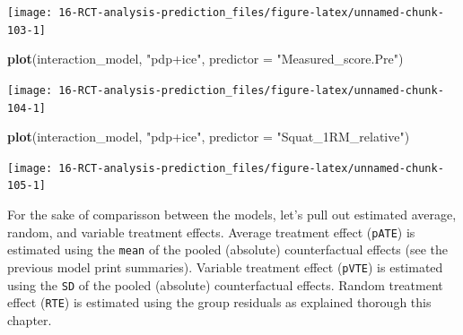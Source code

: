 \documentclass[
]{book}
\newenvironment{Shaded}{\begin{snugshade}}{\end{snugshade}}
\newcommand{\DataTypeTok}[1]{\textcolor[rgb]{0.13,0.29,0.53}{#1}}
\newcommand{\KeywordTok}[1]{\textcolor[rgb]{0.13,0.29,0.53}{\textbf{#1}}}
\newcommand{\NormalTok}[1]{#1}
\newcommand{\StringTok}[1]{\textcolor[rgb]{0.31,0.60,0.02}{#1}}
\begin{document}
\begin{center}\texttt{[image: 16-RCT-analysis-prediction\_files/figure-latex/unnamed-chunk-103-1]} \end{center}

\begin{Shaded}
\begin{Highlighting}[]
\KeywordTok{plot}\NormalTok{(interaction\_model, }\StringTok{"pdp+ice"}\NormalTok{, }\DataTypeTok{predictor =} \StringTok{"Measured\_score.Pre"}\NormalTok{)}
\end{Highlighting}
\end{Shaded}

\begin{center}\texttt{[image: 16-RCT-analysis-prediction\_files/figure-latex/unnamed-chunk-104-1]} \end{center}

\begin{Shaded}
\begin{Highlighting}[]
\KeywordTok{plot}\NormalTok{(interaction\_model, }\StringTok{"pdp+ice"}\NormalTok{, }\DataTypeTok{predictor =} \StringTok{"Squat\_1RM\_relative"}\NormalTok{)}
\end{Highlighting}
\end{Shaded}

\begin{center}\texttt{[image: 16-RCT-analysis-prediction\_files/figure-latex/unnamed-chunk-105-1]} \end{center}

For the sake of comparisson between the models, let's pull out estimated average, random, and variable treatment effects. Average treatment effect (\texttt{pATE}) is estimated using the \texttt{mean} of the pooled (absolute) counterfactual effects (see the previous model print summaries). Variable treatment effect (\texttt{pVTE}) is estimated using the \texttt{SD} of the pooled (absolute) counterfactual effects. Random treatment effect (\texttt{RTE}) is estimated using the group residuals as explained thorough this chapter.
\end{document}
